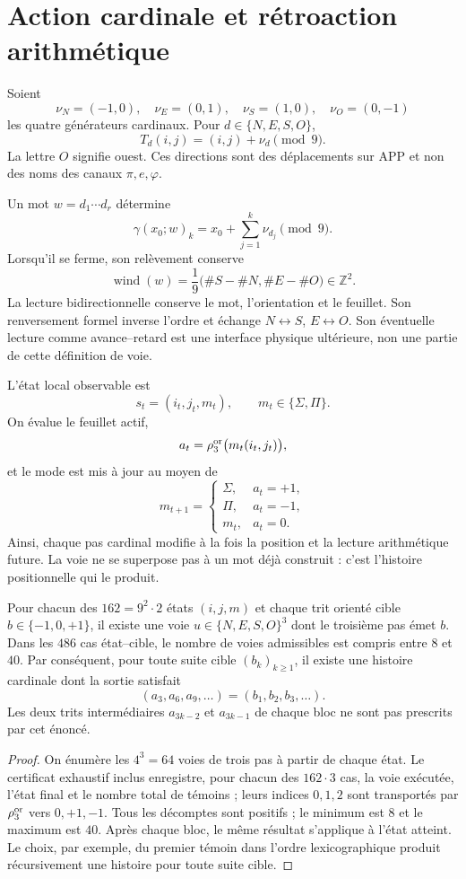 \fi

\section{Action cardinale et rétroaction arithmétique}

Soient
\[
 \nu_N=(-1,0),\quad \nu_E=(0,1),\quad
 \nu_S=(1,0),\quad \nu_O=(0,-1)
\]
les quatre générateurs cardinaux. Pour \(d\in\{N,E,S,O\}\),
\[
 T_d(i,j)=(i,j)+\nu_d\pmod9.
\]
La lettre \(O\) signifie ouest. Ces directions sont des déplacements sur
APP et non des noms des canaux \(\pi,e,\varphi\).

Un mot \(w=d_1\cdots d_r\) détermine
\[
 \gamma(x_0;w)_k=x_0+\sum_{j=1}^{k}\nu_{d_j}\pmod9.
\]
Lorsqu'il se ferme, son relèvement conserve
\[
 \operatorname{wind}(w)=\frac1{9}
 \bigl(\#S-\#N,\#E-\#O\bigr)\in\mathbb Z^2.
\]
La lecture bidirectionnelle conserve le mot, l'orientation et le feuillet. Son
renversement formel inverse l'ordre et échange
\(N\leftrightarrow S\), \(E\leftrightarrow O\). Son éventuelle lecture comme
avance--retard est une interface physique ultérieure, non une partie de cette
définition de voie.

L'état local observable est
\[
 s_t=(i_t,j_t,m_t),
 \qquad m_t\in\{\Sigma,\Pi\}.
\]
On évalue le feuillet actif,
\[
 a_t=\rho_3^{\rm or}\bigl(m_t(i_t,j_t)\bigr),
\]
et le mode est mis à jour au moyen de
\[
 m_{t+1}=
 \begin{cases}
 \Sigma,&a_t=+1,\\
 \Pi,&a_t=-1,\\
 m_t,&a_t=0.
 \end{cases}
\]
Ainsi, chaque pas cardinal modifie à la fois la position et la lecture
arithmétique future. La voie ne se superpose pas à un mot déjà construit : c'est
l'histoire positionnelle qui le produit.

\begin{theorem}
Pour chacun des \(162=9^2\cdot2\) états \((i,j,m)\) et chaque trit
orienté cible \(b\in\{-1,0,+1\}\), il existe une voie
\(u\in\{N,E,S,O\}^3\) dont le troisième pas émet \(b\). Dans les \(486\) cas
état--cible, le nombre de voies admissibles est compris entre
\(8\) et \(40\). Par conséquent, pour toute suite cible
\((b_k)_{k\geq1}\), il existe une histoire cardinale dont la sortie satisfait
\[
 (a_3,a_6,a_9,\ldots)=(b_1,b_2,b_3,\ldots).
\]
Les deux trits intermédiaires \(a_{3k-2}\) et \(a_{3k-1}\) de chaque bloc ne
sont pas prescrits par cet énoncé.
\end{theorem}
\begin{proof}
On énumère les \(4^3=64\) voies de trois pas à partir de chaque état. Le
certificat exhaustif inclus enregistre, pour chacun des
\(162\cdot3\) cas, la voie exécutée, l'état final et le nombre total de
témoins ; leurs indices \(0,1,2\) sont transportés par
\(\rho_3^{\rm or}\) vers \(0,+1,-1\). Tous les décomptes sont positifs ; le
minimum est \(8\) et le maximum est \(40\). Après chaque bloc, le même
résultat s'applique à l'état atteint.
Le choix, par exemple, du premier témoin dans l'ordre lexicographique
produit récursivement une histoire pour toute suite cible.
\end{proof}

